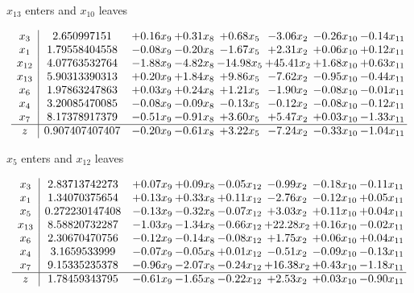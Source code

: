 \documentclass[9pt]{article}
\begin{document}
 $ x_{13} $ enters and $ x_{10} $ leaves 

 \[\begin{array}{c| c c@{\hskip 2pt} c@{\hskip 2pt} c@{\hskip 2pt} c@{\hskip 2pt} c@{\hskip 2pt} c@{\hskip 2pt} }
 x_{3}   &  2.650997151 & +  0.16 x_{9} & +  0.31 x_{8} & +  0.68 x_{5} & -3.06 x_{2} & -0.26 x_{10} & -0.14 x_{11}\\
 x_{1}   &  1.79558404558 & -0.08 x_{9} & -0.20 x_{8} & -1.67 x_{5} & +  2.31 x_{2} & +  0.06 x_{10} & +  0.12 x_{11}\\
 x_{12}   &  4.07763532764 & -1.88 x_{9} & -4.82 x_{8} & -14.98 x_{5} & + 45.41 x_{2} & +  1.68 x_{10} & +  0.63 x_{11}\\
 x_{13}   &  5.90313390313 & +  0.20 x_{9} & +  1.84 x_{8} & +  9.86 x_{5} & -7.62 x_{2} & -0.95 x_{10} & -0.44 x_{11}\\
 x_{6}   &  1.97863247863 & +  0.03 x_{9} & +  0.24 x_{8} & +  1.21 x_{5} & -1.90 x_{2} & -0.08 x_{10} & -0.01 x_{11}\\
 x_{4}   &  3.20085470085 & -0.08 x_{9} & -0.09 x_{8} & -0.13 x_{5} & -0.12 x_{2} & -0.08 x_{10} & -0.12 x_{11}\\
 x_{7}   &  8.17378917379 & -0.51 x_{9} & -0.91 x_{8} & +  3.60 x_{5} & +  5.47 x_{2} & +  0.03 x_{10} & -1.33 x_{11}\\
\hline
z    &  0.907407407407 & -0.20 x_{9} & -0.61 x_{8} & +  3.22 x_{5} & -7.24 x_{2} & -0.33 x_{10} & -1.04 x_{11}\\
\end{array}\]


 $ x_{5} $ enters and $ x_{12} $ leaves 

 \[\begin{array}{c| c c@{\hskip 2pt} c@{\hskip 2pt} c@{\hskip 2pt} c@{\hskip 2pt} c@{\hskip 2pt} c@{\hskip 2pt} }
 x_{3}   &  2.83713742273 & +  0.07 x_{9} & +  0.09 x_{8} & -0.05 x_{12} & -0.99 x_{2} & -0.18 x_{10} & -0.11 x_{11}\\
 x_{1}   &  1.34070375654 & +  0.13 x_{9} & +  0.33 x_{8} & +  0.11 x_{12} & -2.76 x_{2} & -0.12 x_{10} & +  0.05 x_{11}\\
 x_{5}   &  0.272230147408 & -0.13 x_{9} & -0.32 x_{8} & -0.07 x_{12} & +  3.03 x_{2} & +  0.11 x_{10} & +  0.04 x_{11}\\
 x_{13}   &  8.58820732287 & -1.03 x_{9} & -1.34 x_{8} & -0.66 x_{12} & + 22.28 x_{2} & +  0.16 x_{10} & -0.02 x_{11}\\
 x_{6}   &  2.30670470756 & -0.12 x_{9} & -0.14 x_{8} & -0.08 x_{12} & +  1.75 x_{2} & +  0.06 x_{10} & +  0.04 x_{11}\\
 x_{4}   &  3.1659533999 & -0.07 x_{9} & -0.05 x_{8} & +  0.01 x_{12} & -0.51 x_{2} & -0.09 x_{10} & -0.13 x_{11}\\
 x_{7}   &  9.15335235378 & -0.96 x_{9} & -2.07 x_{8} & -0.24 x_{12} & + 16.38 x_{2} & +  0.43 x_{10} & -1.18 x_{11}\\
\hline
z    &  1.78459343795 & -0.61 x_{9} & -1.65 x_{8} & -0.22 x_{12} & +  2.53 x_{2} & +  0.03 x_{10} & -0.90 x_{11}\\
\end{array}\]
\end{document}
